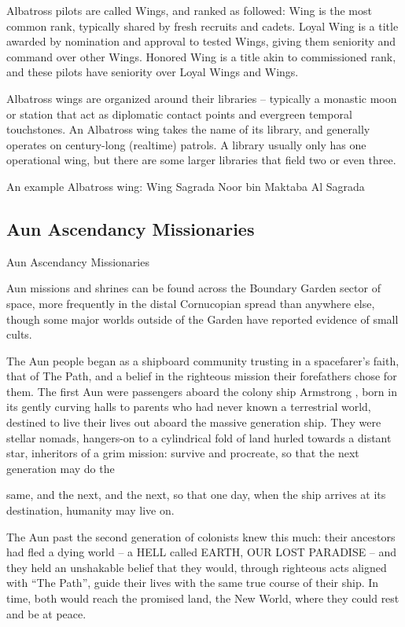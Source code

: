 Albatross pilots are called Wings, and ranked as followed: Wing is the most common rank,  
typically shared by fresh recruits and cadets. Loyal Wing is a title awarded by nomination and  
approval to tested Wings, giving them seniority and command over other Wings. Honored Wing  
is a title akin to commissioned rank, and these pilots have seniority over Loyal Wings and Wings. 
 

Albatross wings are organized around their libraries -- typically a monastic moon or station that  
act as diplomatic contact points and evergreen temporal touchstones. An Albatross wing takes  
the name of its library, and generally operates on century-long (realtime) patrols. A library usually  
only has one operational wing, but there are some larger libraries that field two or even three. 
 

An example Albatross wing: Wing Sagrada Noor bin Maktaba Al Sagrada 
 
\subsection{Aun Ascendancy Missionaries}
Aun Ascendancy Missionaries  

Aun missions and shrines can be found across the Boundary Garden sector of space, more  
frequently in the distal Cornucopian spread than anywhere else, though some major worlds  
outside of the Garden have reported evidence of small cults. 
 

The Aun people began as a shipboard community trusting in a spacefarer's faith, that of The  
Path, and a belief in the righteous mission their forefathers chose for them. The first Aun were  
passengers aboard the colony ship Armstrong , born in its gently curving halls to parents who  
had never known a terrestrial world, destined to live their lives out aboard the massive generation  
ship. They were stellar nomads, hangers-on to a cylindrical fold of land hurled towards a distant  
star, inheritors of a grim mission: survive and procreate, so that the next generation may do the  

                                                                                                         


same, and the next, and the next, so that one day, when the ship arrives at its destination,  
humanity may live on.
 

The Aun past the second generation of colonists knew this much: their ancestors had fled a  
dying world -- a HELL called EARTH, OUR LOST PARADISE -- and they held an unshakable  
belief that they would, through righteous acts aligned with “The Path”, guide their lives with the  
same true course of their ship. In time, both would reach the promised land, the New World,  
where they could rest and be at peace. 
 

